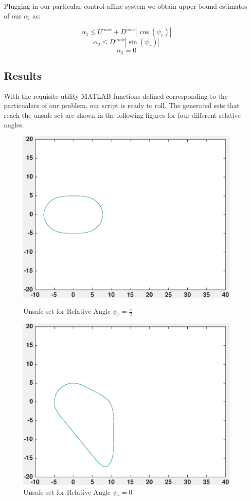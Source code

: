 \documentclass[a4paper]{article}
\begin{document}
Plugging in our particular control-affine system we obtain upper-bound estimates of our $\alpha_i$ as:

$$
\alpha_1 \leq U^{max} + D^{max} |\cos(\psi_r)|
$$
$$
\alpha_2 \leq D^{max} |\sin(\psi_r)|
$$
$$
\alpha_3 = 0
$$

\subsection{Results}
With the requisite utility MATLAB functions defined corresponding to the particualars of our problem, our script is ready to roll.
The generated sets that reach the unsafe set are shown in the following figures for four different relative angles.

\begin{figure}[!ht]
  \centering
  \begin{minipage}[b]{0.4\textwidth}
    \includegraphics[width=1.0\textwidth]{velCont_psi1.eps}
    \caption{Unsafe set for Relative Angle $\psi_r = \frac{\pi}{2}$}
  \end{minipage}
  \hfill
  \begin{minipage}[b]{0.4\textwidth}
    \includegraphics[width=1.0\textwidth]{velCont_psi13.eps}
    \caption{Unsafe set for Relative Angle $\psi_r = 0$}
  \end{minipage}
\end{figure}
\end{document}
